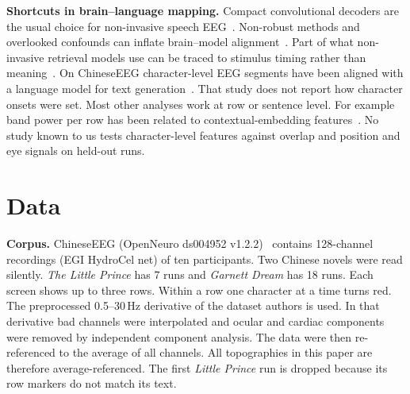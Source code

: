 \documentclass[sigconf]{acmart}
\begin{document}
\textbf{Shortcuts in brain--language mapping.} Compact convolutional decoders are the usual choice for non-invasive speech EEG~\cite{san2026comparative}. Non-robust methods and overlooked confounds can inflate brain--model alignment~\cite{hadidi2026spurious}. Part of what non-invasive retrieval models use can be traced to stimulus timing rather than meaning~\cite{zhang2026decoding}. On ChineseEEG character-level EEG segments have been aligned with a language model for text generation~\cite{lu2025eeg2textcn}. That study does not report how character onsets were set. Most other analyses work at row or sentence level. For example band power per row has been related to contextual-embedding features~\cite{wang2025contextual}. No study known to us tests character-level features against overlap and position and eye signals on held-out runs.

\section{Data}
\label{sec:data}
\textbf{Corpus.} ChineseEEG (OpenNeuro ds004952 v1.2.2)~\cite{mou2024chineseeeg} contains 128-channel recordings (EGI HydroCel net) of ten participants. Two Chinese novels were read silently. \emph{The Little Prince} has 7 runs and \emph{Garnett Dream} has 18 runs. Each screen shows up to three rows. Within a row one character at a time turns red. The preprocessed 0.5--30\,Hz derivative of the dataset authors is used. In that derivative bad channels were interpolated and ocular and cardiac components were removed by independent component analysis. The data were then re-referenced to the average of all channels. All topographies in this paper are therefore average-referenced. The first \emph{Little Prince} run is dropped because its row markers do not match its text.
\end{document}
